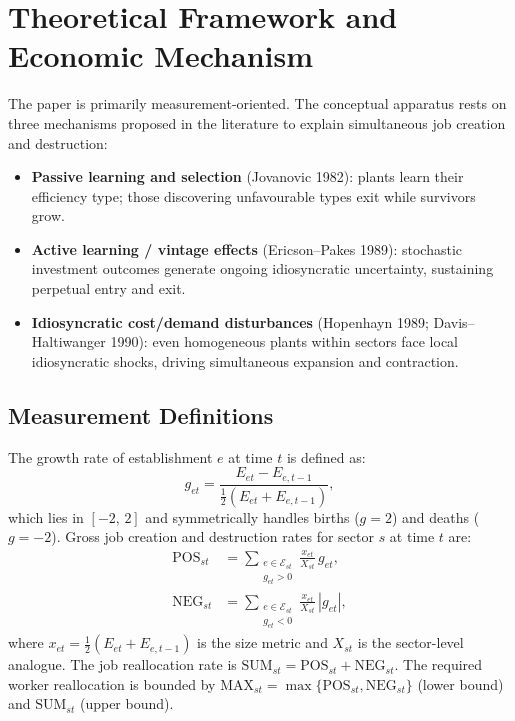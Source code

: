 \section{Theoretical Framework and Economic Mechanism}

The paper is primarily measurement-oriented. The conceptual apparatus rests on
three mechanisms proposed in the literature to explain simultaneous job
creation and destruction:

\begin{itemize}
  \item \textbf{Passive learning and selection} (Jovanovic 1982): plants
    learn their efficiency type; those discovering unfavourable types exit
    while survivors grow.
  \item \textbf{Active learning / vintage effects} (Ericson--Pakes 1989):
    stochastic investment outcomes generate ongoing idiosyncratic uncertainty,
    sustaining perpetual entry and exit.
  \item \textbf{Idiosyncratic cost/demand disturbances} (Hopenhayn 1989;
    Davis--Haltiwanger 1990): even homogeneous plants within sectors face
    local idiosyncratic shocks, driving simultaneous expansion and contraction.
\end{itemize}

\subsection*{Measurement Definitions}

The growth rate of establishment $e$ at time $t$ is defined as:
\begin{equation}
  g_{et} = \frac{E_{et} - E_{e,t-1}}{\tfrac{1}{2}(E_{et} + E_{e,t-1})},
  \label{eq:dh_growth}
\end{equation}
which lies in $[-2,\,2]$ and symmetrically handles births ($g=2$) and
deaths ($g=-2$). Gross job creation and destruction rates for sector $s$
at time $t$ are:
\begin{align}
  \text{POS}_{st} &= \sum_{\substack{e \in \mathcal{E}_{st}\\ g_{et}>0}}
    \frac{x_{et}}{X_{st}}\, g_{et}, \label{eq:pos} \\[4pt]
  \text{NEG}_{st} &= \sum_{\substack{e \in \mathcal{E}_{st}\\ g_{et}<0}}
    \frac{x_{et}}{X_{st}}\, |g_{et}|, \label{eq:neg}
\end{align}
where $x_{et}=\tfrac{1}{2}(E_{et}+E_{e,t-1})$ is the size metric and
$X_{st}$ is the sector-level analogue. The job reallocation rate is
$\text{SUM}_{st}=\text{POS}_{st}+\text{NEG}_{st}$. The required worker
reallocation is bounded by
$\text{MAX}_{st}=\max\{\text{POS}_{st},\text{NEG}_{st}\}$ (lower bound)
and $\text{SUM}_{st}$ (upper bound).

